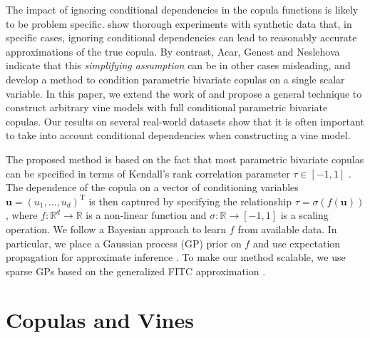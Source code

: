 \documentclass{article}
\begin{document}
The impact of ignoring conditional dependencies in the copula functions is
likely to be problem specific.  \citet{Hobaek2010} show thorough experiments
with synthetic data that, in specific cases, ignoring conditional dependencies
can lead to reasonably accurate approximations of the true copula. By contrast,
Acar, Genest and Neslehova  indicate that this
\emph{simplifying assumption} can be in other cases misleading,
and develop a method to condition parametric bivariate copulas on a single
scalar variable. In this paper, we extend the work of \citet{Acar2012} and
propose a general technique to construct arbitrary vine models with full
conditional parametric bivariate copulas. Our results on several real-world
datasets show that it is often important to take into account 
conditional dependencies when constructing a vine model.

The proposed method is based on the fact that most parametric bivariate copulas
can be specified in terms of Kendall's rank correlation parameter $\tau \in
[-1,1]$ \cite{Joe1997}. The dependence of the copula on a vector of
conditioning variables $\mathbf{u}=(u_1,\ldots,u_d)^\text{T}$ is then captured
by specifying the relationship $\tau = \sigma(f(\mathbf{u}))$, where  $f :
\mathbb{R}^d \rightarrow \mathbb{R}$ is a non-linear function and $\sigma :
\mathbb{R} \rightarrow [-1,1]$ is a scaling operation.  We follow a Bayesian
approach to learn $f$ from available data.  In particular, we place a Gaussian
process (GP) prior on $f$ and use expectation propagation for approximate
inference \cite{Rasmussen2006,Minka2001}. To make our method scalable, we use
sparse GPs based on the generalized FITC approximation
\cite{Snelson2006,Naish-Guzman2007}.  

\section{Copulas and Vines}
\end{document}
